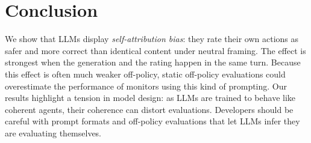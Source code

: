 \section{Conclusion}
\vspace{-1mm}
We show that LLMs display \textit{self-attribution bias}: they rate their own actions as safer and more correct than identical content under neutral framing. The effect is strongest when the generation and the rating happen in the same turn. Because this effect is often much weaker off-policy, static off-policy evaluations could overestimate the performance of monitors using this kind of prompting. %
Our results highlight a tension in model design: as LLMs are trained to behave like coherent agents, their coherence can distort evaluations. Developers should be careful with prompt formats and off-policy evaluations that let LLMs infer they are evaluating themselves. 

